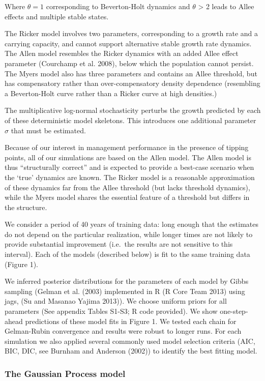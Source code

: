 \documentclass[]{components/elsarticle}
\begin{document}
Where $\theta = 1$ corresponding to Beverton-Holt dynamics and $\theta$
\textgreater{} 2 leads to Allee effects and multiple stable states.

The Ricker model involves two parameters, corresponding to a growth rate
and a carrying capacity, and cannot support alternative stable growth
rate dynamics. The Allen model resembles the Ricker dynamics with an
added Allee effect parameter (Courchamp et al. 2008), below which the
population cannot persist. The Myers model also has three parameters and
contains an Allee threshold, but has compensatory rather than
over-compensatory density dependence (resembling a Beverton-Holt curve
rather than a Ricker curve at high densities.)

The multiplicative log-normal stochasticity perturbs the growth
predicted by each of these deterministic model skeletons. This
introduces one additional parameter $\sigma$ that must be estimated.

Because of our interest in management performance in the presence of
tipping points, all of our simulations are based on the Allen model. The
Allen model is thus ``structurally correct'' and is expected to provide
a best-case scenario when the `true' dynamics are known. The Ricker
model is a reasonable approximation of these dynamics far from the Allee
threshold (but lacks threshold dynamics), while the Myers model shares
the essential feature of a threshold but differs in the structure.

We consider a period of 40 years of training data: long enough that the
estimates do not depend on the particular realization, while longer
times are not likely to provide substantial improvement (i.e.~the
results are not sensitive to this interval). Each of the models
(described below) is fit to the same training data (Figure 1).

We inferred posterior distributions for the parameters of each model by
Gibbs sampling (Gelman et al. (2003) implemented in R (R Core Team 2013)
using jags, (Su and Masanao Yajima 2013)). We choose uniform priors for
all parameters (See appendix Tables S1-S3; R code provided). We show
one-step-ahead predictions of these model fits in Figure 1. We tested
each chain for Gelman-Rubin convergence and results were robust to
longer runs. For each simulation we also applied several commonly used
model selection criteria (AIC, BIC, DIC, see Burnham and Anderson
(2002)) to identify the best fitting model.

\subsubsection{The Gaussian Process
model}\label{the-gaussian-process-model}
\end{document}
